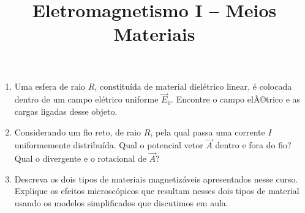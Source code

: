 \newif\ifuseseminar
\useseminartrue


\title{Eletromagnetismo I -- Meios Materiais}	



\begin{enumerate}
	\item Uma esfera de raio $R$, constituída de material dielétrico linear, é
	      colocada dentro de um campo elétrico uniforme $\vec{E}_0$. Encontre o campo
	      elÃ©trico e as cargas ligadas desse objeto.
	\item Considerando um fio reto, de raio $R$, pela qual passa uma corrente $I$
	      uniformemente distribuída. Qual o potencial vetor $\vec{A}$ dentro e fora do
	      fio? Qual o divergente e o rotacional de $\vec{A}$?
	\item Descreva os dois tipos de materiais magnetizáveis apresentados nesse curso.
	      Explique os efeitos microscópicos que resultam nesses dois tipos de material
	      usando os modelos simplificados  que discutimos em aula.
\end{enumerate}



